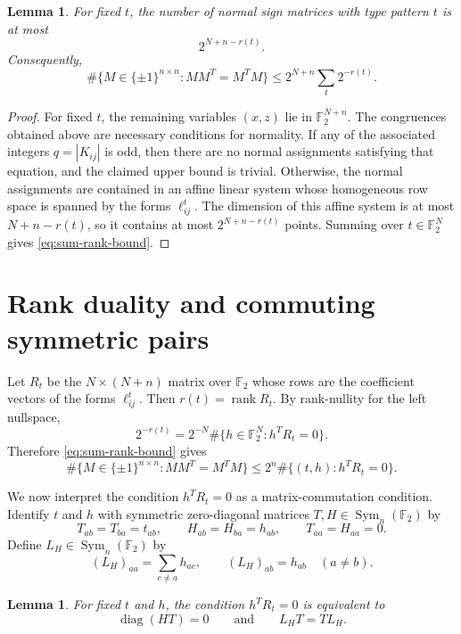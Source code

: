 \documentclass[11pt]{amsart}
\newtheorem{lemma}[theorem]{Lemma}
\theoremstyle{remark}
\numberwithin{equation}{section}
\newcommand{\F}{\mathbb F}
\newcommand{\Sym}{\operatorname{Sym}}
\newcommand{\diag}{\operatorname{diag}}
\newcommand{\rank}{\operatorname{rank}}
\begin{document}
\begin{lemma}\label{lem:linear-filter}
For fixed $t$, the number of normal sign matrices with type pattern $t$ is at most
\[
        2^{N+n-r(t)}.
\]
Consequently,
\begin{equation}\label{eq:sum-rank-bound}
        \#\{M\in\{\pm1\}^{n\times n}:MM^T=M^TM\}
        \leq 2^{N+n}\sum_t2^{-r(t)}.
\end{equation}
\end{lemma}

\begin{proof}
For fixed $t$, the remaining variables $(x,z)$ lie in $\F_2^{N+n}$.  The congruences obtained above are necessary conditions for normality.  If any of the associated integers $q=|K_{ij}|$ is odd, then there are no normal assignments satisfying that equation, and the claimed upper bound is trivial.  Otherwise, the normal assignments are contained in an affine linear system whose homogeneous row space is spanned by the forms $\ell^t_{ij}$.  The dimension of this affine system is at most $N+n-r(t)$, so it contains at most $2^{N+n-r(t)}$ points.  Summing over $t\in\F_2^N$ gives \eqref{eq:sum-rank-bound}.
\end{proof}

\section{Rank duality and commuting symmetric pairs}

Let $R_t$ be the $N\times(N+n)$ matrix over $\F_2$ whose rows are the coefficient vectors of the forms $\ell^t_{ij}$.  Then $r(t)=\rank R_t$.  By rank-nullity for the left nullspace,
\[
        2^{-r(t)}=2^{-N}\#\{h\in\F_2^N:h^TR_t=0\}.
\]
Therefore \eqref{eq:sum-rank-bound} gives
\begin{equation}\label{eq:rank-duality-first}
        \#\{M\in\{\pm1\}^{n\times n}:MM^T=M^TM\}
        \leq 2^n\#\{(t,h):h^TR_t=0\}.
\end{equation}

We now interpret the condition $h^TR_t=0$ as a matrix-commutation condition.  Identify $t$ and $h$ with symmetric zero-diagonal matrices $T,H\in\Sym_n(\F_2)$ by
\[
        T_{ab}=T_{ba}=t_{ab},\qquad H_{ab}=H_{ba}=h_{ab},\qquad T_{aa}=H_{aa}=0.
\]
Define $L_H\in\Sym_n(\F_2)$ by
\[
        (L_H)_{aa}=\sum_{c\ne a}h_{ac},\qquad (L_H)_{ab}=h_{ab}\quad(a\ne b).
\]

\begin{lemma}\label{lem:rank-duality}
For fixed $t$ and $h$, the condition $h^TR_t=0$ is equivalent to
\[
        \diag(HT)=0
        \qquad\text{and}\qquad
        L_HT=TL_H.
\]
\end{lemma}
\end{document}
